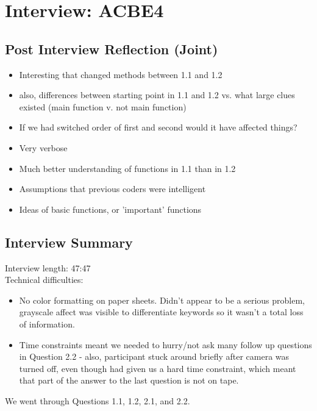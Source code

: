 \documentclass{article}
\begin{document}
\newpage
\section{Interview: ACBE4}
\subsection{Post Interview Reflection (Joint)}
\begin{itemize}
  \item Interesting that changed methods between 1.1 and 1.2
  \item also, differences between starting point in 1.1 and 1.2 vs. what large clues existed (main function v. not main function)
  \item If we had switched order of first and second would it have affected things?
  \item Very verbose
  \item Much better understanding of functions in 1.1 than in 1.2
  \item Assumptions that previous coders were intelligent
  \item Ideas of basic functions, or 'important' functions
\end{itemize}
\subsection{Interview Summary}
Interview length:  47:47 \\
Technical difficulties:
\begin{itemize}
  \item No color formatting on paper sheets. Didn't appear to be a serious problem, grayscale affect was visible to differentiate keywords so it wasn't a total loss of information.
  \item Time constraints meant we needed to hurry/not ask many follow up questions in Question 2.2 - also, participant stuck around briefly after camera was turned off, even though had given us a hard time constraint, which meant that part of the answer to the last question is not on tape.
\end{itemize}
We went through Questions 1.1, 1.2, 2.1, and 2.2.
\end{document}
